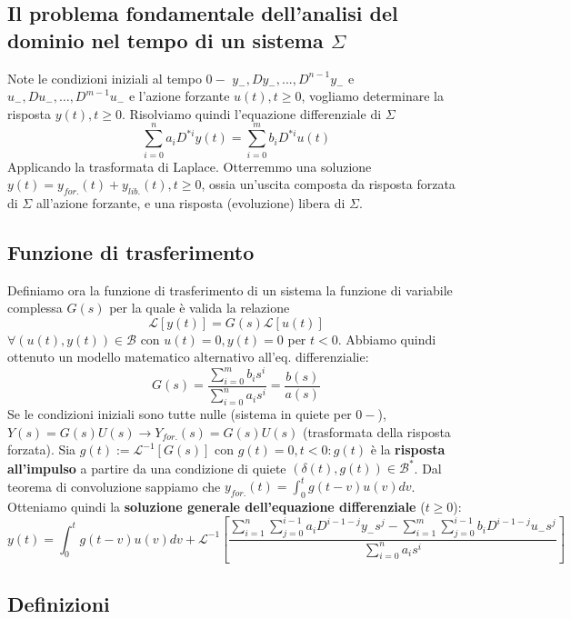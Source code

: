 \documentclass[11pt]{article}
\begin{document}
\subsection{Il problema fondamentale dell'analisi del dominio nel tempo di un sistema $\Sigma$}
Note le condizioni iniziali al tempo $0-$  $y_-, Dy_-,...,D^{n-1}y_-$ e $u_-,Du_-,\dots,D^{m-1}u_-$ e l'azione forzante $u(t), t\ge0$, vogliamo determinare la risposta $y(t), t\ge0$.
Risolviamo quindi l'equazione differenziale di $\Sigma$
\begin{displaymath}
    \sum_{i=0}^n a_i D^{*i} y(t) = \sum_{i=0}^m b_i D^{*i} u(t)
\end{displaymath}
Applicando la trasformata di Laplace. Otterremmo una soluzione $y(t) = y_{for.}(t) + y_{lib.}(t), t\ge0$, ossia un'uscita composta da risposta forzata di $\Sigma$ all'azione forzante, e una risposta (evoluzione) libera di $\Sigma$.
\subsection{Funzione di trasferimento}
Definiamo ora la funzione di trasferimento di un sistema la funzione di variabile complessa $G(s)$ per la quale è valida la relazione
\begin{displaymath}
    \mathcal{L}[y(t)] = G(s)\mathcal{L}[u(t)]
\end{displaymath}
$\forall (u(t), y(t)) \in \mathcal{B}$ con $u(t)=0, y(t)=0$ per $t<0$.
Abbiamo quindi ottenuto un modello matematico alternativo all'eq. differenzialie:
\begin{displaymath}
    G(s)=\frac{\sum_{i=0}^m b_i s^i}{\sum_{i=0}^n a_i s^i}=\frac{b(s)}{a(s)}
\end{displaymath}
Se le condizioni iniziali sono tutte nulle (sistema in quiete per $0-$), $Y(s)=G(s)U(s)\rightarrow Y_{for.}(s)=G(s)U(s)$ (trasformata della risposta forzata). Sia $g(t):=\mathcal{L}^{-1} [G(s)]$ con $g(t)=0, t<0: g(t)$ è la \textbf{risposta all'impulso} a partire da una condizione di quiete $(\delta(t), g(t)) \in \mathcal{B}^*$. Dal teorema di convoluzione sappiamo che $y_{for.}(t) = \int_0^t g(t-v)u(v)dv$. Otteniamo quindi la \textbf{soluzione generale dell'equazione differenziale} ($t\ge0$):
\begin{displaymath}
    y(t)=\int_0^t g(t-v)u(v)dv + \mathcal{L}^{-1}\left[\frac{\sum_{i=1}^n \sum_{j=0}^{i-1}a_i D^{i-1-j}y_- s^j - \sum_{i=1}^{m} \sum_{j=0}^{i-1} b_i D^{i-1-j}u_- s^j}{\sum_{i=0}^n a_is^i}\right]
\end{displaymath}
\subsection{Definizioni}
\end{document}
